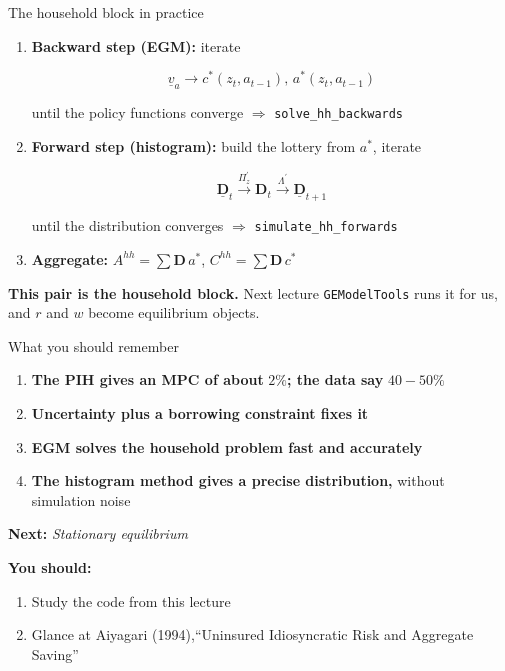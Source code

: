 \documentclass[
  10pt,
  ignorenonframetext,
  aspectratio=43,
  english,
  handout]{beamer}
\providecommand{\tightlist}{%
  \setlength{\itemsep}{0pt}\setlength{\parskip}{0pt}}
\begin{document}
\begin{frame}[fragile]{The household block in practice}
\protect{}\label{the-household-block-in-practice}
\begin{enumerate}
\item
  \textbf{Backward step (EGM):} iterate\vspace{-1mm}

  \[
   \underline{v}_{a}\rightarrow c^{\ast}(z_{t},a_{t-1}),\,a^{\ast}(z_{t},a_{t-1})
   \]

  until the policy functions converge \(\Rightarrow\)
  \texttt{solve\_hh\_backwards}
\item
  \textbf{Forward step (histogram):} build the lottery from
  \(a^{\ast}\), iterate\vspace{-1mm}

  \[
   \underline{\boldsymbol{D}}_{t}\overset{\Pi^{\prime}_{z}}{\longrightarrow}\boldsymbol{D}_{t}\overset{\Lambda^{\prime}}{\longrightarrow}\underline{\boldsymbol{D}}_{t+1}
   \]

  until the distribution converges \(\Rightarrow\)
  \texttt{simulate\_hh\_forwards}
\item
  \textbf{Aggregate:} \(A^{hh}=\sum\boldsymbol{D}\,a^{\ast}\),
  \(C^{hh}=\sum\boldsymbol{D}\,c^{\ast}\)
\end{enumerate}

\vspace{2mm}

\textbf{This pair is the household block.} Next lecture
\texttt{GEModelTools} runs it for us, and \(r\) and \(w\) become
equilibrium objects.
\end{frame}

\begin{frame}{What you should remember}
\protect{}\label{what-you-should-remember}
\begin{enumerate}
\tightlist
\item
  \textbf{The PIH gives an MPC of about} \(2\%\)\textbf{; the data say}
  \(40-50\%\)
\item
  \textbf{Uncertainty plus a borrowing constraint fixes it}
\item
  \textbf{EGM solves the household problem fast and accurately}
\item
  \textbf{The histogram method gives a precise distribution,} without
  simulation noise
\end{enumerate}

\textbf{Next:} \emph{Stationary equilibrium}

\textbf{You should:}

\begin{enumerate}
\tightlist
\item
  Study the code from this lecture
\item
  Glance at Aiyagari (1994),``Uninsured Idiosyncratic Risk and Aggregate
  Saving''
\end{enumerate}
\end{frame}
\end{document}
